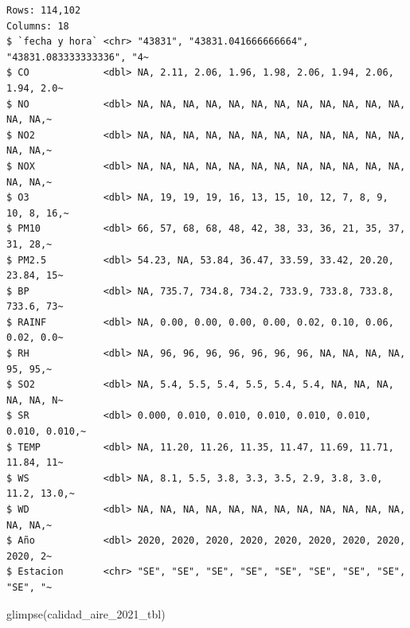 \documentclass[
  letterpaper,
  DIV=11,
  numbers=noendperiod]{scrartcl}
\newenvironment{Shaded}{\begin{snugshade}}{\end{snugshade}}
\newcommand{\FunctionTok}[1]{\textcolor[rgb]{0.28,0.35,0.67}{#1}}
\newcommand{\NormalTok}[1]{\textcolor[rgb]{0.00,0.23,0.31}{#1}}
\begin{document}
\begin{verbatim}
Rows: 114,102
Columns: 18
$ `fecha y hora` <chr> "43831", "43831.041666666664", "43831.083333333336", "4~
$ CO             <dbl> NA, 2.11, 2.06, 1.96, 1.98, 2.06, 1.94, 2.06, 1.94, 2.0~
$ NO             <dbl> NA, NA, NA, NA, NA, NA, NA, NA, NA, NA, NA, NA, NA, NA,~
$ NO2            <dbl> NA, NA, NA, NA, NA, NA, NA, NA, NA, NA, NA, NA, NA, NA,~
$ NOX            <dbl> NA, NA, NA, NA, NA, NA, NA, NA, NA, NA, NA, NA, NA, NA,~
$ O3             <dbl> NA, 19, 19, 19, 16, 13, 15, 10, 12, 7, 8, 9, 10, 8, 16,~
$ PM10           <dbl> 66, 57, 68, 68, 48, 42, 38, 33, 36, 21, 35, 37, 31, 28,~
$ PM2.5          <dbl> 54.23, NA, 53.84, 36.47, 33.59, 33.42, 20.20, 23.84, 15~
$ BP             <dbl> NA, 735.7, 734.8, 734.2, 733.9, 733.8, 733.8, 733.6, 73~
$ RAINF          <dbl> NA, 0.00, 0.00, 0.00, 0.00, 0.02, 0.10, 0.06, 0.02, 0.0~
$ RH             <dbl> NA, 96, 96, 96, 96, 96, 96, 96, NA, NA, NA, NA, 95, 95,~
$ SO2            <dbl> NA, 5.4, 5.5, 5.4, 5.5, 5.4, 5.4, NA, NA, NA, NA, NA, N~
$ SR             <dbl> 0.000, 0.010, 0.010, 0.010, 0.010, 0.010, 0.010, 0.010,~
$ TEMP           <dbl> NA, 11.20, 11.26, 11.35, 11.47, 11.69, 11.71, 11.84, 11~
$ WS             <dbl> NA, 8.1, 5.5, 3.8, 3.3, 3.5, 2.9, 3.8, 3.0, 11.2, 13.0,~
$ WD             <dbl> NA, NA, NA, NA, NA, NA, NA, NA, NA, NA, NA, NA, NA, NA,~
$ Año            <dbl> 2020, 2020, 2020, 2020, 2020, 2020, 2020, 2020, 2020, 2~
$ Estacion       <chr> "SE", "SE", "SE", "SE", "SE", "SE", "SE", "SE", "SE", "~
\end{verbatim}

\begin{Shaded}
\begin{Highlighting}[]
\FunctionTok{glimpse}\NormalTok{(calidad\_aire\_2021\_tbl)}
\end{Highlighting}
\end{Shaded}
\end{document}
